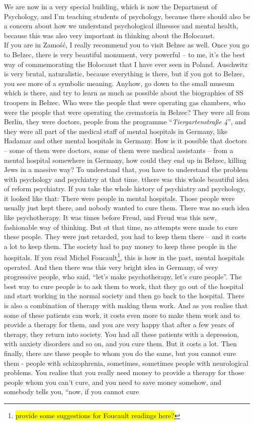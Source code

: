 We are now in a very special building, which is now the Department of Psychology, and I’m teaching students of psychology, because there should also be a concern about how we understand psychological illnesses and mental health, because this was also very important in thinking about the Holocaust.\\ If you are in Zamość, I really recommend you to visit Bełzec as well. Once you go to Bełzec, there is very beautiful monument, very powerful – to me, it’s the best way of commemorating the Holocaust that I have ever seen in Poland. Auschwitz is very brutal, naturalistic, because everything is there, but if you got to Bełzec, you see more of a symbolic meaning. Anyhow, go down to the small museum which is there, and try to learn as much as possible about the biographies of SS troopers in Bełzec. Who were the people that were operating gas chambers, who were the people that were operating the crematoria in Bełzec? They were all from Berlin, they were doctors, people from the programme ``\textit{Tiergartenstraße 4}'', and they were all part of the medical staff of mental hospitals in Germany, like Hadamar and other mental hospitals in Germany. How is it possible that doctors – some of them were doctors, some of them were medical assistants – from a mental hospital somewhere in Germany, how could they end up in Bełzec, killing Jews in a massive way? To understand that, you have to understand the problem with psychology and psychiatry at that time. tthere was this whole beautiful idea of reform psychiatry. If you take the whole history of psychiatry and psychology, it looked like that: There were people in mental hospitals. Those people were usually just kept there, and nobody wanted to cure them. There was no such idea like psychotherapy. It was times before Freud, and Freud was this new, fashionable way of thinking. But at that time, no attempts were made to cure these people. They were just retarded, you had to keep them there – and it costs a lot to keep them. The society had to pay money to keep these people in the hospitals. If you read Michel Foucault\footnote{\colorbox{yellow}{provide some suggestions for Foucault readings here?}}, this is how in the past, mental hospitals operated. And then there was this very bright idea in Germany, of very progressive people, who said, ``let’s make psychotherapy, let’s cure people''. The best way to cure people is to ask them to work, that they go out of the hospital and start working in the normal society and then go back to the hospital. There is also a combination of therapy with making them work. And as you realise that some of these patients can work, it costs even more to make them work and to provide a therapy for them, and you are very happy that after a few years of therapy, they return into society. You had all these patients with a depression, with anxiety disorders and so on, and you cure them. But it costs a lot. Then finally, there are these people to whom you do the same, but you cannot cure them - people with schizophrenia, sometimes, sometimes people with neurological problems. You realise that you really need money to provide a therapy for those people whom you can’t cure, and you need to save money somehow, and somebody tells you, ``now, if you cannot cure 